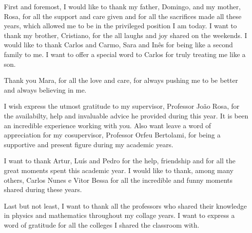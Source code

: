 \documentclass[11pt, twoside]{Thesis} %
\begin{document}
\pagestyle{fancy}



\frontmatter %

\maketitle

	




\begin{acknowledgements}
	First and foremost, I would like to thank my father, Domingo, and my mother, Rosa, for all the support and care given and for all the sacrifices made all these years, which allowed me to be in the privileged position I am today.
	I want to thank my brother, Cristiano, for the all laughs and joy shared on the weekends.
	I would like to thank Carlos and Carmo, Sara and Inês for being like a second family to me. I want to offer a special word to Carlos for truly treating me like a son.
	
	Thank you Mara, for all the love and care, for always pushing me to be better and always believing in me.

	I wish express the utmost gratitude to my supervisor, Professor João Rosa, for the availabilty, help and invaluable advice he provided during this year. It is been an incredible experience working with you. Also want leave a word of appreciation for my cosupervisor, Professor Orfeu Bertolami, for being a supportive and present figure during my academic years.
	
	I want to thank Artur, Luís and Pedro for the help, friendship and for all the great moments spent this academic year.
	I would like to thank, among many others, Carlos Nunes e Vitor Bessa for all the incredible and funny moments shared during these years.

	Last but not least, I want to thank all the professors who shared their knowledge in physics and mathematics throughout my collage years.
	I want to express a word of gratitude for all the colleges I shared the classroom with.

\end{acknowledgements}
\end{document}
